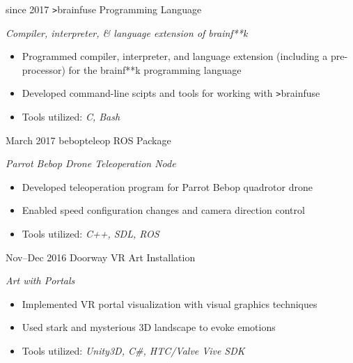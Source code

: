 \documentclass[]{friggeri-cv}
\begin{document}
\begin{entrylist}
  \entry
    {since 2017}
    {\texttt{>}brainfuse}
    {Programming Language}
    {\emph{Compiler, interpreter, \& language extension of brainf**k}
    \begin{itemize}[leftmargin=1.2em]
    \item Programmed compiler, interpreter, and language extension (including a pre-processor) for the brainf**k programming language
    \item Developed command-line scipts and tools for working with \texttt{>}brainfuse
    \item Tools utilized: \emph{C, Bash}
    \end{itemize}}
    
  \entry
    {March 2017}
    {bebop\textunderscore teleop}
    {ROS Package}
    {\emph{Parrot Bebop Drone Teleoperation Node}
    \begin{itemize}[leftmargin=1.2em]
    \item Developed teleoperation program for Parrot Bebop quadrotor drone
    \item Enabled speed configuration changes and camera direction control
    \item Tools utilized: \emph{C++, SDL, ROS}
    \end{itemize}}
    
  \entry
    {Nov--Dec 2016}
    {Doorway}
    {VR Art Installation}
    {\emph{Art with Portals}
    \begin{itemize}[leftmargin=1.2em]
    \item Implemented VR portal visualization with visual graphics techniques
    \item Used stark and mysterious 3D landscape to evoke emotions
    \item Tools utilized: \emph{Unity3D, C\#,  HTC/Valve Vive SDK}
    \end{itemize}}

\end{entrylist}
\end{document}
